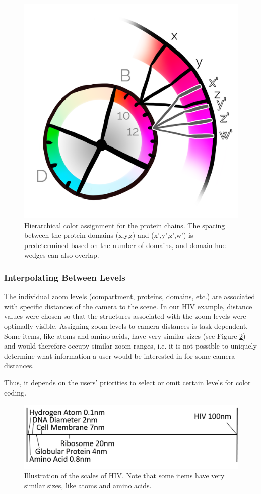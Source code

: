\documentclass{egpubl}
\begin{document}
	
	\begin{figure}
		\centering
		\includegraphics[width=0.4\linewidth]{Figures/overlap}
		\caption{Hierarchical color assignment for the protein chains. 
			The spacing between the protein domains (x,y,z) and (x',y',z',w') is predetermined based on the number of domains, and domain hue wedges can also overlap. 
		}
		\label{fig:overlap}
	\end{figure}
	
	

	
	\subsubsection{Interpolating Between Levels}
	
	The individual zoom levels (compartment, proteins, domains, etc.) are associated with specific distances of the camera to the scene. 
	In our HIV example, distance values were chosen so that the structures associated with the zoom levels were optimally visible. 
	Assigning zoom levels to camera distances is task-dependent. 
	Some items, like atoms and amino acids, have very similar sizes (see Figure \ref{fig:hivScale}) and would therefore occupy similar zoom ranges, i.e. it is not possible to uniquely determine what information a user would be interested in for some camera distances.
	
	Thus, it depends on the users' priorities to select or omit certain levels for color coding. 
	
	\begin{figure}
		\centering
		\includegraphics[width=0.7\linewidth]{Figures/hivscale}
		\caption{Illustration of the scales of HIV. Note that some items have very similar sizes, like atoms and amino acids. }
		\label{fig:hivScale}
	\end{figure}
	
\end{document}
